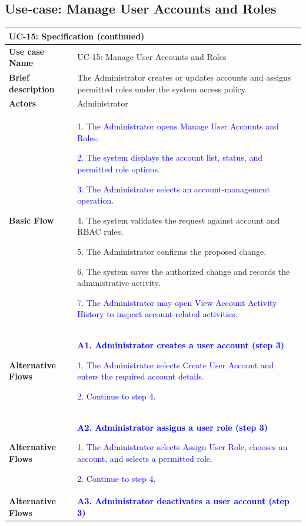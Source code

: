 \subsection{Use-case: Manage User Accounts and Roles}
\label{uc:uc-15}
\begin{longtable}{|p{}|p{}|}
\hline
\endfirsthead
\multicolumn{2}{l}{\textbf{UC-15: Specification (continued)}}\\
\hline
\endhead
\textbf{Use case Name} & UC-15: Manage User Accounts and Roles \\ \hline
\textbf{Brief description} &
The Administrator creates or updates accounts and assigns permitted roles under the system access policy.
\\ \hline
\textbf{Actors} & Administrator \\ \hline
\textbf{Basic Flow} &
\textcolor{blue}{1. The Administrator opens Manage User Accounts and Roles.}\par
\textcolor{blue}{2. The system displays the account list, status, and permitted role options.}\par
\textcolor{blue}{3. The Administrator selects an account-management operation.}\par
4. The system validates the request against account and RBAC rules.\par
5. The Administrator confirms the proposed change.\par
6. The system saves the authorized change and records the administrative activity.\par
\textcolor{blue}{7. The Administrator may open View Account Activity History to inspect account-related activities.}
\\ \hline
\textbf{Alternative Flows} &
\textcolor{blue}{\textbf{A1. Administrator creates a user account (step 3)}}\par
\textcolor{blue}{1. The Administrator selects Create User Account and enters the required account details.}\par
\textcolor{blue}{2. Continue to step 4.}
\\ \hline
\textbf{Alternative Flows} &
\textcolor{blue}{\textbf{A2. Administrator assigns a user role (step 3)}}\par
\textcolor{blue}{1. The Administrator selects Assign User Role, chooses an account, and selects a permitted role.}\par
\textcolor{blue}{2. Continue to step 4.}
\\ \hline
\textbf{Alternative Flows} &
\textcolor{blue}{\textbf{A3. Administrator deactivates a user account (step 3)}}\par

\end{longtable}
